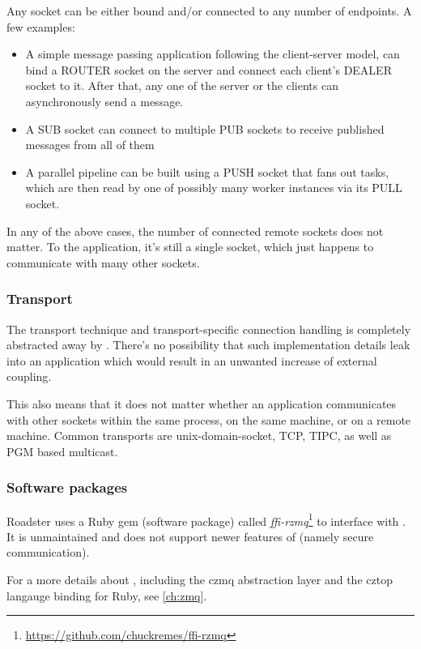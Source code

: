 Any socket can be either bound and/or connected to any number of endpoints. A few examples:

\begin{itemize}
	\item A simple message passing application following the client-server
		model, can bind a ROUTER socket on the server and connect each
		client's DEALER socket to it. After that, any one of the server
		or the clients can asynchronously send a message.

	\item A SUB socket can connect to multiple PUB sockets to receive
		published messages from all of them

	\item A parallel pipeline can be built using a PUSH socket that fans
		out tasks, which are then read by one of possibly many worker
		instances via its PULL socket.
\end{itemize}

In any of the above cases, the number of connected remote sockets does not
matter. To the application, it's still a single socket, which just happens to
communicate with many other sockets.

\subsubsection{Transport}
The transport technique and transport-specific connection handling is completely
abstracted away by \zmq. There's no possibility that such implementation
details leak into an application which would result in an unwanted increase of
external coupling.

This also means that it does not matter whether an application communicates with
other \zmq sockets within the same process, on the same machine, or on a remote
machine. Common transports are \gls{unix-domain-socket}, \gls{TCP},
\gls{TIPC}, as well as \gls{PGM} based multicast.

\subsubsection{Software packages}
Roadster uses a Ruby gem (software package) called
\emph{ffi-rzmq}\footnote{\url{https://github.com/chuckremes/ffi-rzmq}} to
interface with \zmq. It is unmaintained and does not support newer features of
\zmq (namely secure communication).


For a more details about \zmq, including the \gls{czmq} abstraction layer and
the \gls{cztop} langauge binding for Ruby, see \autoref{ch:zmq}.


